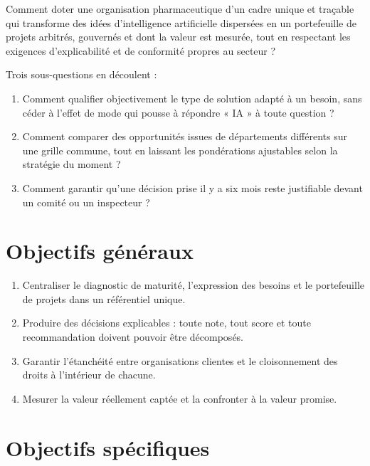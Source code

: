 \begin{remarque}[Problématique]
Comment doter une organisation pharmaceutique d'un cadre unique et traçable qui
transforme des idées d'intelligence artificielle dispersées en un portefeuille de
projets arbitrés, gouvernés et dont la valeur est mesurée, tout en respectant les
exigences d'explicabilité et de conformité propres au secteur ?
\end{remarque}

Trois sous-questions en découlent :

\begin{enumerate}
  \item Comment qualifier objectivement le type de solution adapté à un besoin, sans
    céder à l'effet de mode qui pousse à répondre « IA » à toute question ?
  \item Comment comparer des opportunités issues de départements différents sur une
    grille commune, tout en laissant les pondérations ajustables selon la stratégie du
    moment ?
  \item Comment garantir qu'une décision prise il y a six mois reste justifiable devant
    un comité ou un inspecteur ?
\end{enumerate}

\section{Objectifs généraux}

\begin{enumerate}
  \item Centraliser le diagnostic de maturité, l'expression des besoins et le
    portefeuille de projets dans un référentiel unique.
  \item Produire des décisions explicables : toute note, tout score et toute
    recommandation doivent pouvoir être décomposés.
  \item Garantir l'étanchéité entre organisations clientes et le cloisonnement des
    droits à l'intérieur de chacune.
  \item Mesurer la valeur réellement captée et la confronter à la valeur promise.
\end{enumerate}

\section{Objectifs spécifiques}

